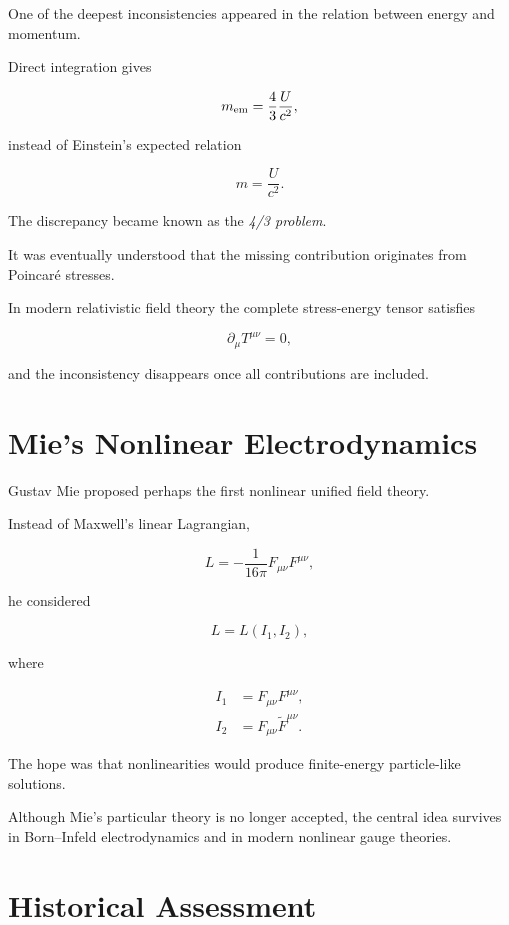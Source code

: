 One of the deepest inconsistencies appeared in the relation between energy and
momentum.

Direct integration gives

\begin{equation}
m_{\rm em}
=
\frac43
\frac{U}{c^2},
\end{equation}

instead of Einstein's expected relation

\begin{equation}
m=\frac{U}{c^2}.
\end{equation}

The discrepancy became known as the
\emph{4/3 problem}.

It was eventually understood that the missing contribution originates from
Poincaré stresses.

In modern relativistic field theory the complete stress-energy tensor satisfies

\begin{equation}
\partial_\mu T^{\mu\nu}=0,
\end{equation}

and the inconsistency disappears once all contributions are included.

\section{Mie's Nonlinear Electrodynamics}

Gustav Mie proposed perhaps the first nonlinear unified field theory.

Instead of Maxwell's linear Lagrangian,

\begin{equation}
L
=
-\frac1{16\pi}
F_{\mu\nu}F^{\mu\nu},
\end{equation}

he considered

\begin{equation}
L
=
L(I_1,I_2),
\end{equation}

where

\begin{align}
I_1
&=
F_{\mu\nu}F^{\mu\nu},
\\
I_2
&=
F_{\mu\nu}\tilde F^{\mu\nu}.
\end{align}

The hope was that nonlinearities would produce finite-energy particle-like
solutions.

Although Mie's particular theory is no longer accepted, the central idea
survives in Born--Infeld electrodynamics and in modern nonlinear gauge
theories.\section{Historical Assessment}

